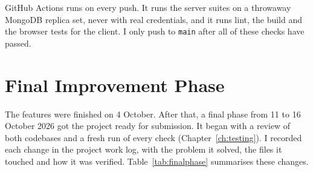\documentclass{standalone}
\begin{document}
GitHub Actions runs on every push. It runs the server suites on a throwaway MongoDB replica set, never with real credentials, and it runs lint, the build and the browser tests for the client. I only push to \texttt{main} after all of these checks have passed.

\section{Final Improvement Phase}
\label{sec:finalphase}
The features were finished on 4 October. After that, a final phase from 11 to 16 October 2026 got the project ready for submission. It began with a review of both codebases and a fresh run of every check (Chapter~\ref{ch:testing}). I recorded each change in the project work log, with the problem it solved, the files it touched and how it was verified. Table~\ref{tab:finalphase} summarises these changes.
\end{document}
